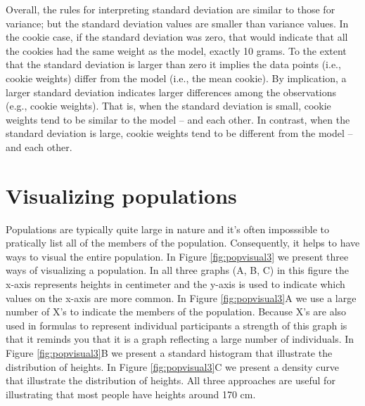 \documentclass[
]{krantz}
\begin{document}
Overall, the rules for interpreting standard deviation are similar to those for variance; but the standard deviation values are smaller than variance values. In the cookie case, if the standard deviation was zero, that would indicate that all the cookies had the same weight as the model, exactly 10 grams. To the extent that the standard deviation is larger than zero it implies the data points (i.e., cookie weights) differ from the model (i.e., the mean cookie). By implication, a larger standard deviation indicates larger differences among the observations (e.g., cookie weights). That is, when the standard deviation is small, cookie weights tend to be similar to the model -- and each other. In contrast, when the standard deviation is large, cookie weights tend to be different from the model -- and each other.

\hypertarget{visualizing-populations}{%
\section{Visualizing populations}\label{visualizing-populations}}

Populations are typically quite large in nature and it's often imposssible to pratically list all of the members of the population. Consequently, it helps to have ways to visual the entire population. In Figure \ref{fig:popvisual3} we present three ways of visualizing a population. In all three graphs (A, B, C) in this figure the x-axis represents heights in centimeter and the y-axis is used to indicate which values on the x-axis are more common. In Figure \ref{fig:popvisual3}A we use a large number of X's to indicate the members of the population. Because X's are also used in formulas to represent individual participants a strength of this graph is that it reminds you that it is a graph reflecting a large number of individuals. In Figure \ref{fig:popvisual3}B we present a standard histogram that illustrate the distribution of heights. In Figure \ref{fig:popvisual3}C we present a density curve that illustrate the distribution of heights. All three approaches are useful for illustrating that most people have heights around 170 cm.
\end{document}

